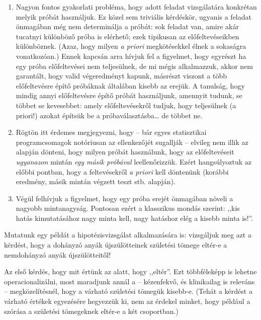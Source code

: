 \documentclass[]{book}
\providecommand{\tightlist}{%
  \setlength{\itemsep}{0pt}\setlength{\parskip}{0pt}}
\begin{document}
\begin{enumerate}
\def\labelenumi{\arabic{enumi}.}
\tightlist
\item
  Nagyon fontos gyakorlati probléma, hogy adott feladat vizsgálatára
  konkrétan melyik próbát használjuk. Ez közel sem triviális kérdéskör,
  ugyanis a feladat önmagában még nem determinálja a próbát: sok feladat
  van, amire akár tucatnyi különböző próba is elérhető; ezek tipikusan
  az előfeltevéseikben különböznek. (Azaz, hogy milyen \emph{a priori}
  megkötésekkel élnek a sokaságra vonatkozóan.) Ennek kapcsán arra
  hívjuk fel a figyelmet, hogy egyrészt ha egy próba előfeltevései nem
  teljesülnek, de mi mégis alkalmazzuk, akkor nem garantált, hogy valid
  végeredményt kapunk, másrészt viszont a több előfeltevésre építő
  próbáknak általában kisebb az erejük. A tanulság, hogy mindig annyi
  előfeltevésre építő próbát használjunk, amennyit tudunk, se többet se
  kevesebbet: amely előfeltevésekről tudjuk, hogy teljesülnek (a
  priori!) azokat építsük be a próbaválasztásba\dots{} de többet ne.
\item
  Rögtön itt érdemes megjegyezni, hogy -- bár egyes statisztikai
  programcsomagok notóriusan az ellenkezőjét sugallják -- elvileg nem
  illik az alapján dönteni, hogy milyen próbát használunk, hogy az
  előfeltevéseit \emph{ugyanazon} mintán \emph{egy másik próbával}
  leellenőrizzük. Ezért hangsúlyoztuk az előbbi pontban, hogy a
  feltevésekről \emph{a priori} kell döntenünk (korábbi eredmény, másik
  mintán végzett teszt stb. alapján).
\item
  Végül felhívjuk a figyelmet, hogy egy próba erejét önmagában növeli a
  nagyobb mintanagyság. Pontosan ezért a klasszikus mondás szerint:
  ,,kis hatás kimutatásához nagy minta kell, nagy hatáshoz elég a kisebb
  minta is!''.
\end{enumerate}

Mutatunk egy példát a hipotézisvizsgálat alkalmazására is: vizsgáljuk
meg azt a kérdést, hogy a dohányzó anyák újszülötteinek születési tömege
eltér-e a nemdohányzó anyák újszülötteitől!

Az első kérdés, hogy mit értünk az alatt, hogy ,,eltér''. Ezt
többféleképp is lehetne operacionalizálni, most maradjunk annál a --
kézenfekvő, és klinikailag is releváns -- megközelítésnél, hogy a
várható születési tömegük kisebb-e. (Tehát a kérdést a várható értékek
egyezésére hegyezzük ki, nem az érdekel minket, hogy például a szórása a
születési tömegeknek eltér-e a két csoportban.)
\end{document}

